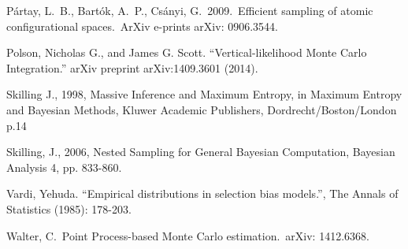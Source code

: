 \documentclass[journal,article,accept,moreauthors,pdftex,12pt,a4paper]{mdpi}
\begin{document}
\begin{thebibliography}{999}
 P{\'a}rtay, L.~B., 
Bart{\'o}k, A.~P., Cs{\'a}nyi, G.\ 2009.\ Efficient sampling of atomic 
configurational spaces.\ ArXiv e-prints arXiv: 0906.3544. 

Polson, Nicholas G., and James G. Scott. ``Vertical-likelihood Monte Carlo
Integration.'' arXiv preprint arXiv:1409.3601 (2014).

Skilling J., 1998, Massive Inference and Maximum Entropy, in Maximum Entropy
and Bayesian Methods, Kluwer Academic Publishers, Dordrecht/Boston/London p.14

 Skilling, J., 2006, Nested Sampling for General Bayesian Computation, Bayesian Analysis 4, pp. 833-860.

Vardi, Yehuda. ``Empirical distributions in selection bias models.'', The Annals of Statistics (1985): 178-203.

Walter, C.\ Point Process-based Monte Carlo estimation.\ arXiv: 1412.6368.


\end{thebibliography}

%
%


%


%
\end{document}
